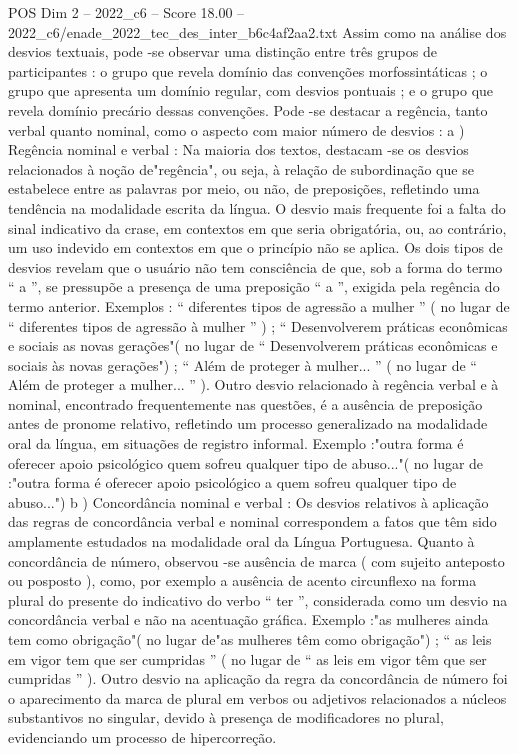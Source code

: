 \begin{textsample}{POS Dim 2 – 2022\_c6 – Score 18.00 – 2022\_c6/enade\_2022\_tec\_des\_inter\_b6c4af2aa2.txt}
Assim como na análise dos desvios textuais, pode -se observar uma distinção entre três grupos de participantes : o grupo que revela domínio das convenções morfossintáticas ; o grupo que apresenta um domínio regular, com desvios pontuais ; e o grupo que revela domínio precário dessas convenções.
Pode -se destacar a regência, tanto verbal quanto nominal, como o aspecto com maior número de desvios : a ) Regência nominal e verbal : Na maioria dos textos, destacam -se os desvios relacionados à noção de"regência", ou seja, à relação de subordinação que se estabelece entre as palavras por meio, ou não, de preposições, refletindo uma tendência na modalidade escrita da língua.
O desvio mais frequente foi a falta do sinal indicativo da crase, em contextos em que seria obrigatória, ou, ao contrário, um uso indevido em contextos em que o princípio não se aplica.
Os dois tipos de desvios revelam que o usuário não tem consciência de que, sob a forma do termo “ a ”, se pressupõe a presença de uma preposição “ a ”, exigida pela regência do termo anterior.
Exemplos : “ diferentes tipos de agressão a mulher ” ( no lugar de “ diferentes tipos de agressão à mulher ” ) ; “ Desenvolverem práticas econômicas e sociais as novas gerações"( no lugar de “ Desenvolverem práticas econômicas e sociais às novas gerações") ; “ Além de proteger à mulher... ” ( no lugar de “ Além de proteger a mulher... ” ).
Outro desvio relacionado à regência verbal e à nominal, encontrado frequentemente nas questões, é a ausência de preposição antes de pronome relativo, refletindo um processo generalizado na modalidade oral da língua, em situações de registro informal.
Exemplo :"outra forma é oferecer apoio psicológico quem sofreu qualquer tipo de abuso..."( no lugar de :"outra forma é oferecer apoio psicológico a quem sofreu qualquer tipo de abuso...") b ) Concordância nominal e verbal : Os desvios relativos à aplicação das regras de concordância verbal e nominal correspondem a fatos que têm sido amplamente estudados na modalidade oral da Língua Portuguesa.
Quanto à concordância de número, observou -se ausência de marca ( com sujeito anteposto ou posposto ), como, por exemplo a ausência de acento circunflexo na forma plural do presente do indicativo do verbo “ ter ”, considerada como um desvio na concordância verbal e não na acentuação gráfica.
Exemplo :"as mulheres ainda tem como obrigação"( no lugar de"as mulheres têm como obrigação") ; “ as leis em vigor tem que ser cumpridas ” ( no lugar de “ as leis em vigor têm que ser cumpridas ” ).
Outro desvio na aplicação da regra da concordância de número foi o aparecimento da marca de plural em verbos ou adjetivos relacionados a núcleos substantivos no singular, devido à presença de modificadores no plural, evidenciando um processo de hipercorreção.

\end{textsample}
